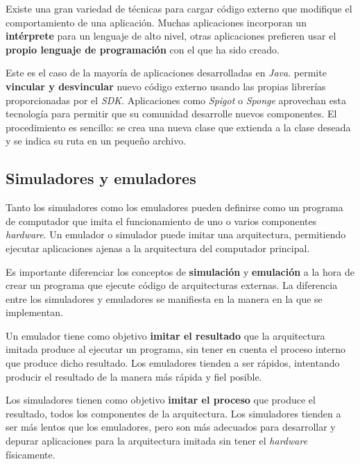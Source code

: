 Existe una gran variedad de técnicas para cargar código externo
que modifique el comportamiento de una aplicación.
Muchas aplicaciones incorporan un \textbf{intérprete} para un
lenguaje de alto nivel, otras aplicaciones prefieren usar
el \textbf{propio lenguaje de programación} con el que ha sido creado.

Este es el caso de la mayoría de aplicaciones desarrolladas
en \textit{Java}\cite{JAVA_PLUGINS}.
 permite \textbf{vincular y desvincular} nuevo código externo
usando las propias librerías proporcionadas por el \textit{SDK}.
Aplicaciones como \textit{Spigot}\cite{SPIGOT} o \textit{Sponge}\cite{SPONGE} aprovechan esta
tecnología para permitir que su comunidad desarrolle nuevos
componentes.
El procedimiento es sencillo: se crea una nueva clase que extienda a la
clase deseada y se indica su ruta en un pequeño archivo.

\subsection{Simuladores y emuladores}
\label{subsec:simuladores-y-emuladores}

Tanto los simuladores como los emuladores pueden definirse como un
programa de computador que imita el funcionamiento de uno o varios
componentes \textit{hardware}.
Un emulador o simulador puede imitar una arquitectura, permitiendo
ejecutar aplicaciones ajenas a la arquitectura del computador principal.

Es importante diferenciar los conceptos de \textbf{simulación}
y \textbf{emulación} a la hora de crear un programa que ejecute
código de arquitecturas externas.
La diferencia entre los simuladores y emuladores se manifiesta
en la manera en la que se implementan.

Un emulador tiene como objetivo \textbf{imitar el resultado}
que la arquitectura imitada produce al ejecutar un programa, sin tener
en cuenta el proceso interno que produce dicho resultado.
Los emuladores tienden a ser rápidos, intentando producir el resultado
de la manera más rápida y fiel posible.

Los simuladores tienen como objetivo \textbf{imitar el proceso}
que produce el resultado,  todos los componentes de la arquitectura.
Los simuladores tienden a ser más lentos que los emuladores, pero son más
adecuados para desarrollar y depurar aplicaciones para la arquitectura
imitada sin tener el \textit{hardware} físicamente.

